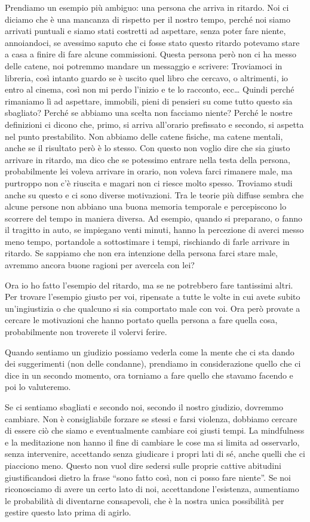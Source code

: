\documentclass[12pt]{book} %
\begin{document}
Prendiamo un esempio più ambiguo:
una persona che arriva in ritardo. Noi ci diciamo che è una mancanza di rispetto per
il nostro tempo, perché noi siamo arrivati puntuali e siamo stati costretti ad aspettare, senza poter fare niente,
annoiandoci, se avessimo saputo che ci fosse stato questo ritardo potevamo stare a casa a finire di fare alcune commissioni.
Questa persona però non ci ha messo delle catene, noi potremmo mandare un messaggio e
scrivere: Troviamoci in libreria, così intanto guardo se è uscito quel libro che cercavo, o altrimenti, io entro al
cinema, così non mi perdo l'inizio e te lo racconto, ecc… Quindi perché rimaniamo lì ad aspettare,
immobili, pieni di pensieri su come tutto questo sia sbagliato? Perché se abbiamo una scelta non facciamo niente?
Perché le nostre definizioni ci dicono che, primo, si arriva all'orario prefissato e secondo, si
aspetta nel punto prestabilito. Non abbiamo delle catene fisiche, ma catene mentali, anche se il risultato però è lo
stesso. Con questo non voglio dire che sia giusto arrivare in ritardo, ma dico che se potessimo entrare nella testa
della persona, probabilmente lei voleva arrivare in orario, non voleva farci rimanere
male, ma purtroppo non c'è riuscita e magari non ci riesce molto spesso. Troviamo studi anche su questo e ci sono diverse motivazioni. Tra le teorie più diffuse sembra che alcune persone non abbiano una
buona memoria temporale e percepiscono lo scorrere del tempo in maniera diversa. Ad esempio, quando si
preparano, o fanno il tragitto in auto, se impiegano venti minuti, hanno la percezione di averci messo meno tempo, portandole a sottostimare i tempi, rischiando di farle arrivare in ritardo. Se sappiamo che
non era intenzione della persona farci stare male, avremmo ancora buone ragioni per avercela con lei?

Ora io ho fatto l'esempio del ritardo, ma se ne potrebbero fare tantissimi altri. Per trovare
l'esempio giusto per voi, ripensate a tutte le volte in cui avete subito un'ingiustizia o
che qualcuno si sia comportato male con voi. Ora però provate a
cercare le motivazioni che hanno portato quella persona a fare quella cosa, probabilmente non troverete il volervi
ferire.

Quando sentiamo un giudizio possiamo vederla come la mente che ci sta
dando dei suggerimenti (non delle condanne), prendiamo in considerazione quello che ci dice in un secondo momento, ora torniamo a fare quello che stavamo facendo e poi lo valuteremo.

Se ci sentiamo
sbagliati e secondo noi, secondo il nostro giudizio, dovremmo cambiare. Non è consigliabile forzare se stessi e farsi
violenza, dobbiamo cercare di essere ciò che siamo e eventualmente cambiare coi giusti tempi. La mindfulness e la
meditazione non hanno il fine di cambiare le cose ma si limita ad osservarlo, senza intervenire, accettando senza giudicare i
propri lati di sé, anche quelli che ci piacciono meno. Questo non vuol dire sedersi sulle proprie cattive abitudini
giustificandosi dietro la frase “sono fatto così, non ci posso fare niente”. Se noi riconosciamo di avere un certo lato
di noi, accettandone l'esistenza, aumentiamo le probabilità di diventarne consapevoli, che è la nostra unica possibilità per gestire questo lato prima di agirlo.
\end{document}
